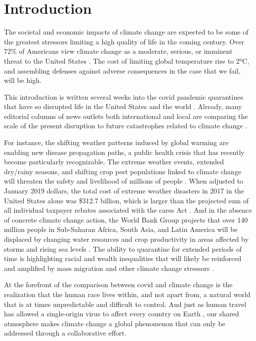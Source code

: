 \chapter{Introduction}
\label{sec:intro}

The societal and economic impacts of climate change are expected to be some of the greatest stressors limiting a high quality of life in the coming century. Over 72\% of Americans view climate change as a moderate, serious, or imminent threat to the United States \cite{caspani}. The cost of limiting global temperature rise to 2\si{\celsius}, and assembling defenses against adverse consequences in the case that we fail, will be high. 

This introduction is written several weeks into the \gls{covid} pandemic quarantines that have so disrupted life in the United States and the world \cite{newsom,italy,india}. Already, many editorial columns of news outlets both international and local are comparing the scale of the present disruption to future catastrophes related to climate change \cite{wallace_wells,wyns,rosebrugh}. 

For instance, the shifting weather patterns induced by global warming are enabling new disease propagation paths, a public health crisis that has recently become particularly recognizable. The extreme weather events, extended dry/rainy seasons, and shifting crop pest populations linked to climate change will threaten the safety and livelihood of millions of people \cite{ahmed, smith_disasters}. When adjusted to January 2019 dollars, the total cost of extreme weather disasters in 2017 in the United States alone was \$312.7 billion, which is larger than the projected sum of all individual taxpayer rebates associated with the \gls{cares} Act \cite{smith_disasters,watson}. And in the absence of concrete climate change action, the World Bank Group projects that over 140 million people in Sub-Saharan Africa, South Asia, and Latin America will be displaced by changing water resources and crop productivity in areas affected by storms and rising sea levels \cite{wbg}. The ability to quarantine for extended periods of time is highlighting racial and wealth inequalities that will likely be reinforced and amplified by mass migration and other climate change stressors \cite{howell}.

At the forefront of the comparison between \gls{covid} and climate change is the realization that the human race lives within, and not apart from, a natural world that is at times unpredictable and difficult to control. And just as human travel has allowed a single-origin virus to affect every country on Earth \cite{who}, our shared atmosphere makes climate change a global phenomenon that can only be addressed through a collaborative effort. 


